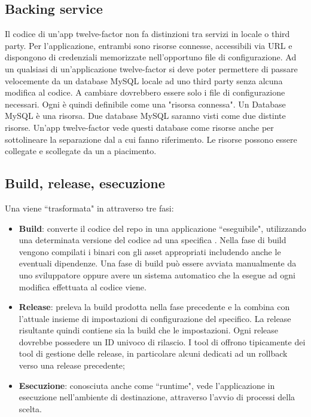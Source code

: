 \documentclass[NormeDiProgetto.tex]{subfiles}
\begin{document}
\subsection{Backing service}
Il codice di un'app twelve-factor non fa distinzioni tra servizi in locale o third party. Per l'applicazione, entrambi sono risorse connesse, accessibili via URL e dispongono di credenziali memorizzate nell'opportuno file di configurazione. Ad un qualsiasi  di un'applicazione twelve-factor si deve poter permettere di passare velocemente da un database MySQL locale ad uno third party senza alcuna modifica al codice. A cambiare dovrebbero essere solo i file di configurazione necessari.
Ogni  è quindi definibile come una "risorsa connessa". Un Database MySQL è una risorsa. Due database MySQL saranno visti come due distinte risorse. Un'app twelve-factor vede questi database come risorse anche per sottolineare la separazione dal  a cui fanno riferimento. Le risorse possono essere collegate e scollegate da un  a piacimento.

\subsection{Build, release, esecuzione}
Una  viene \textquotedblleft trasformata" in  attraverso tre fasi:
\begin{itemize}
\item \textbf{Build}: converte il codice del repo in una applicazione \textquotedblleft eseguibile", utilizzando una determinata versione del codice ad una specifica . Nella fase di build vengono compilati i binari con gli asset appropriati includendo anche le eventuali dipendenze. Una fase di build può essere avviata manualmente da uno sviluppatore oppure avere un sistema automatico che la esegue ad ogni modifica effettuata al codice viene.
\item \textbf{Release}: preleva la build prodotta nella fase precedente e la combina con l'attuale insieme di impostazioni di configurazione del  specifico. La release risultante quindi contiene sia la build che le impostazioni. Ogni release dovrebbe possedere un ID univoco di rilascio. I tool di  offrono tipicamente dei tool di gestione delle release, in particolare alcuni dedicati ad un rollback verso una release precedente;
\item \textbf{Esecuzione}: conosciuta anche come \textquotedblleft runtime", vede l'applicazione in esecuzione nell'ambiente di destinazione, attraverso l'avvio di processi della  scelta.
\end{itemize}
\end{document}
